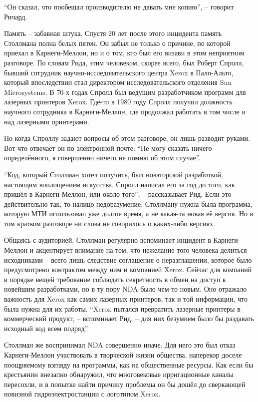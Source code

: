 \enquote{Он сказал, что пообещал производителю не давать мне копию}, -- говорит Ричард.

Память -- забавная штука. Спустя 20 лет после этого инцидента память Столлмана полна белых пятен. Он забыл не только о причине, по которой приехал в Карнеги-Меллон, но и о том, кто был его визави в этом неприятном разговоре. По словам Рида, этим человеком, скорее всего, был Роберт Спролл, бывший сотрудник научно-исследовательского центра Xerox в Пало-Альто, который впоследствии стал директором исследовательского отделения Sun Microsystems. В 70-х годах Спролл был ведущим разработчиком программ для лазерных принтеров Xerox. Где-то в 1980 году Спролл получил должность научного сотрудника в Карнеги-Меллон, где продолжал работать в том числе и над лазерными принтерами.

Но когда Спроллу задают вопросы об этом разговоре, он лишь разводит руками. Вот что отвечает он по электронной почте: \enquote{Не могу сказать ничего определённого, я совершенно ничего не помню об этом случае}.

\enquote{Код, который Столлман хотел получить, был новаторской разработкой, настоящим воплощением искусства. Спролл написал его за год до того, как пришёл в Карнеги-Меллон, или около того}, -- рассказывает Рид. Если это действительно так, то налицо недоразумение: Столлману нужна была программа, которую МТИ использовал уже долгое время, а не какая-та новая её версия. Но в том кратком разговоре ни слова не говорилось о каких-либо версиях.

Общаясь с аудиторией, Столлман регулярно вспоминает инцидент в Карнеги-Меллон и акцентирует внимание на том, что нежелание того человека делиться исходниками -- всего лишь следствие соглашения о неразглашении, которое было предусмотрено контрактом между ним и компанией Xerox. Сейчас для компаний в порядке вещей требование соблюдать секретность в обмен на доступ к новейшим разработками, но в ту пору NDA было чем-то новым. Оно отражало важность для Xerox как самих лазерных принтеров, так и той информации, что была нужна для их работы. \enquote{Xerox пытался превратить лазерные принтеры в коммерческий продукт, -- вспоминает Рид, -- для них безумием было бы раздавать исходный код всем подряд}.

Столлман же воспринимал NDA совершенно иначе. Для него это был отказ Карнеги-Меллон участвовать в творческой жизни общества, наперекор доселе поощряемому взгляду на программы, как на общественные ресурсы. Как если бы крестьянин внезапно обнаружил, что многовековые ирригационные каналы пересохли, и в попытке найти причину проблемы он бы дошёл до сверкающей новизной гидроэлектростанции с логотипом Xerox.

